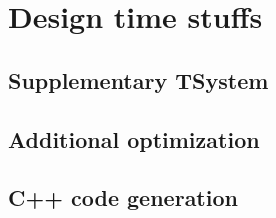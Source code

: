 \chapter{Design time stuffs}



\section{Supplementary TSystem}


\section{Additional optimization}


\section{C++ code generation}


